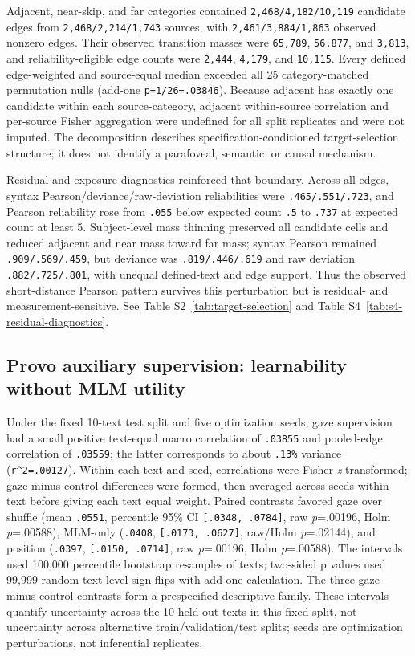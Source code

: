 \documentclass[11pt]{article}
\begin{document}
Adjacent, near-skip, and far categories contained \texttt{2,468/4,182/10,119} candidate edges from \texttt{2,468/2,214/1,743} sources, with \texttt{2,461/3,884/1,863} observed nonzero edges. Their observed transition masses were \texttt{65,789}, \texttt{56,877}, and \texttt{3,813}, and reliability-eligible edge counts were \texttt{2,444}, \texttt{4,179}, and \texttt{10,115}. Every defined edge-weighted and source-equal median exceeded all 25 category-matched permutation nulls (add-one \texttt{p=1/26=.03846}). Because adjacent has exactly one candidate within each source-category, adjacent within-source correlation and per-source Fisher aggregation were undefined for all split replicates and were not imputed. The decomposition describes specification-conditioned target-selection structure; it does not identify a parafoveal, semantic, or causal mechanism.

Residual and exposure diagnostics reinforced that boundary. Across all edges, syntax Pearson/deviance/raw-deviation reliabilities were \texttt{.465/.551/.723}, and Pearson reliability rose from \texttt{.055} below expected count \texttt{.5} to \texttt{.737} at expected count at least 5. Subject-level mass thinning preserved all candidate cells and reduced adjacent and near mass toward far mass; syntax Pearson remained \texttt{.909/.569/.459}, but deviance was \texttt{.819/.446/.619} and raw deviation \texttt{.882/.725/.801}, with unequal defined-text and edge support. Thus the observed short-distance Pearson pattern survives this perturbation but is residual- and measurement-sensitive. See Table S2~\ref{tab:target-selection} and Table S4~\ref{tab:s4-residual-diagnostics}.

\subsection{Provo auxiliary supervision: learnability without MLM utility}

Under the fixed 10-text test split and five optimization seeds, gaze supervision had a small positive text-equal macro correlation of \texttt{.03855} and pooled-edge correlation of \texttt{.03559}; the latter corresponds to about \texttt{.13\%} variance (\texttt{r\textasciicircum{}2=.00127}). Within each text and seed, correlations were Fisher-\emph{z} transformed; gaze-minus-control differences were formed, then averaged across seeds within text before giving each text equal weight. Paired contrasts favored gaze over shuffle (mean \texttt{.0551}, percentile 95\% CI \texttt{[.0348, .0784]}, raw \emph{p}=.00196, Holm \emph{p}=.00588), MLM-only (\texttt{.0408}, \texttt{[.0173, .0627]}, raw/Holm \emph{p}=.02144), and position (\texttt{.0397}, \texttt{[.0150, .0714]}, raw \emph{p}=.00196, Holm \emph{p}=.00588). The intervals used 100,000 percentile bootstrap resamples of texts; two-sided p values used 99,999 random text-level sign flips with add-one calculation. The three gaze-minus-control contrasts form a prespecified descriptive family. These intervals quantify uncertainty across the 10 held-out texts in this fixed split, not uncertainty across alternative train/validation/test splits; seeds are optimization perturbations, not inferential replicates.
\end{document}
